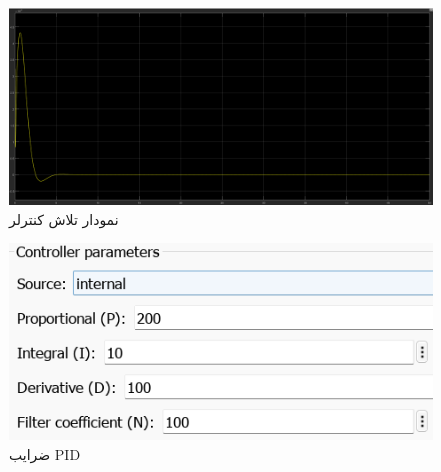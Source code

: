 \begin{figure}[H]
	\centering
	\includegraphics[width=1\linewidth]{../img/Q3_High_disturbance_Tube_Ceffort}
	\caption{نمودار تلاش کنترلر}
	\label{fig:q3highdisturbancetubeceffort}
\end{figure}
\begin{figure}[H]
	\centering
	\includegraphics[width=1\linewidth]{../img/Q3_High_disturbance_Tube_PID}
	\caption{ضرایب PID}
	\label{fig:q3highdisturbancetubepid}
\end{figure}

